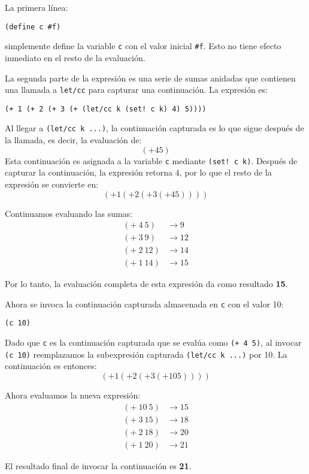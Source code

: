 \documentclass{article}
\begin{document}
La primera línea:
\begin{lstlisting}
(define c #f)
\end{lstlisting}
simplemente define la variable \texttt{c} con el valor inicial \texttt{\#f}. Esto no tiene efecto inmediato en el resto de la evaluación.

La segunda parte de la expresión es una serie de sumas anidadas que contienen una llamada a \texttt{let/cc} para capturar una continuación. La expresión es:
\begin{lstlisting}
(+ 1 (+ 2 (+ 3 (+ (let/cc k (set! c k) 4) 5))))
\end{lstlisting}

Al llegar a \texttt{(let/cc k ...)}, la continuación capturada es lo que sigue después de la llamada, es decir, la evaluación de:
\[
(+ 4 5)
\]
Esta continuación es asignada a la variable \texttt{c} mediante \texttt{(set! c k)}. Después de capturar la continuación, la expresión retorna 4, por lo que el resto de la expresión se convierte en:
\[
(+ 1 (+ 2 (+ 3 (+ 4 5))))
\]

Continuamos evaluando las sumas:
\begin{align*}
(+\ 4 \ 5) &\rightarrow 9 \\
(+\ 3 \ 9) &\rightarrow 12 \\
(+\ 2 \ 12) &\rightarrow 14 \\
(+\ 1 \ 14) &\rightarrow 15
\end{align*}

Por lo tanto, la evaluación completa de esta expresión da como resultado \textbf{15}.


Ahora se invoca la continuación capturada almacenada en \texttt{c} con el valor 10:
\begin{lstlisting}
(c 10)
\end{lstlisting}
Dado que \texttt{c} es la continuación capturada que se evalúa como \texttt{(+ 4 5)}, al invocar \texttt{(c 10)} reemplazamos la subexpresión capturada \texttt{(let/cc k ...)} por 10. La continuación es entonces:
\[
(+ 1 (+ 2 (+ 3 (+ 10 5))))
\]

Ahora evaluamos la nueva expresión:
\begin{align*}
(+\ 10\ 5) &\rightarrow 15 \\
(+\ 3\ 15) &\rightarrow 18 \\
(+\ 2\ 18) &\rightarrow 20 \\
(+\ 1\ 20) &\rightarrow 21
\end{align*}

El resultado final de invocar la continuación es \textbf{21}.
\end{document}
